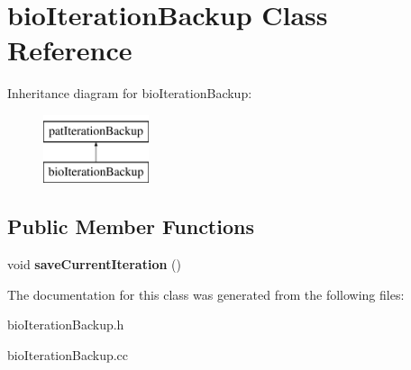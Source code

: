 \hypertarget{classbio_iteration_backup}{}\section{bio\+Iteration\+Backup Class Reference}
\label{classbio_iteration_backup}
Inheritance diagram for bio\+Iteration\+Backup\+:\begin{figure}[H]
\begin{center}
\leavevmode
\includegraphics[height=2.000000cm]{classbio_iteration_backup}
\end{center}
\end{figure}
\subsection*{Public Member Functions}
\begin{DoxyCompactItemize}
\item 
\mbox{\label{classbio_iteration_backup_aa98ac0c41449412ef31e12c75ae9215d}} 
void {\bfseries save\+Current\+Iteration} ()
\end{DoxyCompactItemize}


The documentation for this class was generated from the following files\+:\begin{DoxyCompactItemize}
\item 
bio\+Iteration\+Backup.\+h\item 
bio\+Iteration\+Backup.\+cc\end{DoxyCompactItemize}
